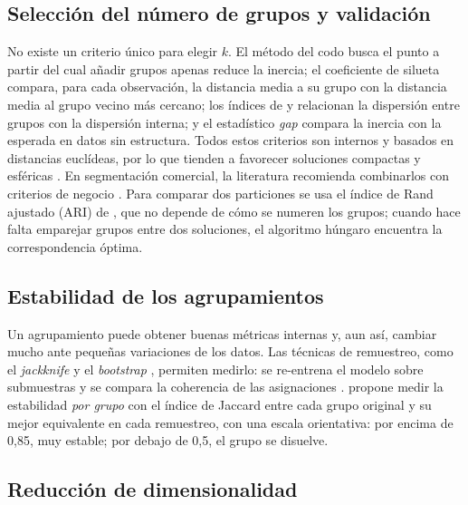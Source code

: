 \documentclass[11pt,a4paper]{article}
\begin{document}
\subsection{Selección del número de grupos y validación}

No existe un criterio único para elegir $k$. El método del codo \parencite{thorndike1953} busca el punto a partir del
cual añadir grupos apenas reduce la inercia; el coeficiente de silueta \parencite{rousseeuw1987,kaufman1990} compara, para cada
observación, la distancia media a su grupo con la distancia media al grupo vecino más cercano; los índices de
\textcite{calinski1974} y \textcite{davies1979} relacionan la dispersión entre grupos con la dispersión interna; y el
estadístico \emph{gap} \parencite{tibshirani2001} compara la inercia con la esperada en datos sin estructura. Todos estos
criterios son internos y basados en distancias euclídeas, por lo que tienden a favorecer soluciones compactas y
esféricas \parencite{hastie2009}. En segmentación comercial, la literatura recomienda combinarlos con criterios de
negocio \parencite{wedel2000}. Para comparar dos particiones se usa el índice de Rand ajustado (ARI) de
\textcite{hubert1985}, que no depende de cómo se numeren los grupos; cuando hace falta emparejar grupos entre dos
soluciones, el algoritmo húngaro \parencite{kuhn1955} encuentra la correspondencia óptima.

\subsection{Estabilidad de los agrupamientos}

Un agrupamiento puede obtener buenas métricas internas y, aun así, cambiar mucho ante pequeñas variaciones de los
datos. Las técnicas de remuestreo, como el \emph{jackknife} \parencite{quenouille1949} y el \emph{bootstrap}
\parencite{efron1979}, permiten medirlo: se re-entrena el modelo sobre submuestras y se compara la coherencia de las
asignaciones \parencite{benhur2002,lange2004,vonluxburg2010}. \textcite{hennig2007} propone medir la estabilidad
\emph{por grupo} con el índice de Jaccard entre cada grupo original y su mejor equivalente en cada remuestreo, con una
escala orientativa: por encima de 0,85, muy estable; por debajo de 0,5, el grupo se disuelve.

\subsection{Reducción de dimensionalidad}
\end{document}
